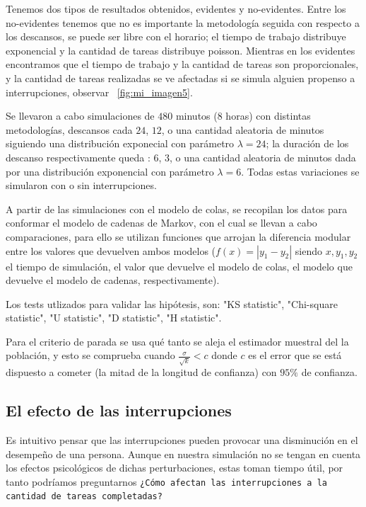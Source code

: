 \documentclass[10pt,a4paper,twocolumn]{article}
\begin{document}
Tenemos dos tipos de resultados obtenidos, evidentes y no-evidentes. Entre los no-evidentes tenemos que no es importante la metodología seguida con respecto a los descansos, se puede ser libre con el horario; el tiempo de trabajo distribuye exponencial y la cantidad de tareas distribuye poisson. Mientras en los evidentes encontramos que el tiempo de trabajo y la cantidad de tareas son proporcionales, y la cantidad de tareas realizadas se ve afectadas si se simula alguien propenso a interrupciones, observar ~\ref{fig:mi_imagen5}.

Se llevaron a cabo simulaciones de $480$ minutos ($8$ horas) con distintas metodologías, descansos cada $24$, $12$, o una cantidad aleatoria de minutos siguiendo una distribuci\'on exponecial con par\'ametro $\lambda = 24$; la duración de los descanso respectivamente queda : $6$, $3$, o una  cantidad aleatoria de minutos dada por una distribuci\'on exponencial con par\'ametro $\lambda = 6$. Todas estas variaciones se simularon con o sin interrupciones. 

A partir de las simulaciones con el modelo de colas, se recopilan los datos para conformar el modelo de cadenas de Markov, con el cual se llevan a cabo comparaciones, para ello se utilizan funciones que arrojan la diferencia modular entre los valores que devuelven ambos modelos ($f(x) = |y_1 - y_2|$ siendo $x,y_1,y_2$ el tiempo de simulaci\'on, el valor que devuelve el modelo de colas, el modelo que devuelve el modelo de cadenas, respectivamente). 

Los tests utlizados para validar las hip\'otesis, son: "KS statistic", "Chi-square statistic", "U statistic", "D statistic", "H statistic". 

Para el criterio de parada se usa qu\'e tanto se aleja el estimador muestral del la poblaci\'on, y esto se comprueba cuando $\frac{\sigma}{\sqrt{k}} < c$ donde $c$ es el error que se est\'a dispuesto a cometer (la mitad de la longitud de confianza) con $95\%$ de confianza. 

\subsection{El efecto de las interrupciones}

Es intuitivo pensar que las interrupciones pueden provocar una disminuci\'on en el desempeño de una persona. Aunque en nuestra simulación no se tengan en cuenta los efectos psicológicos de dichas perturbaciones, estas toman tiempo útil, por tanto podríamos preguntarnos \texttt{¿Cómo afectan las interrupciones a la cantidad de tareas completadas?}
\end{document}
